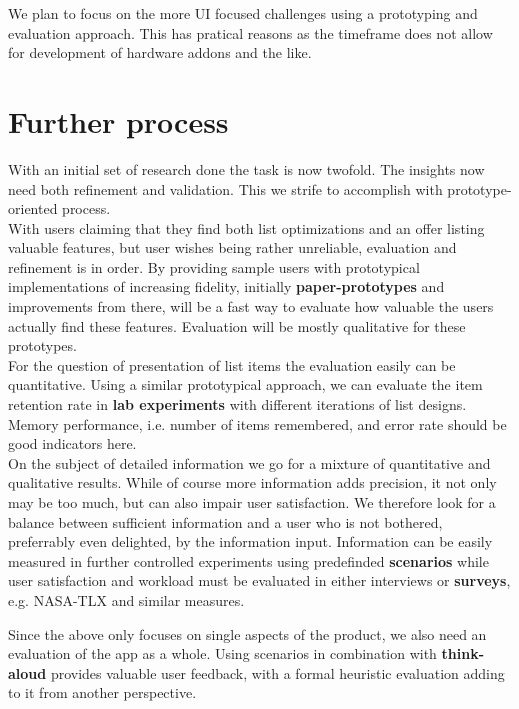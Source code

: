 \documentclass{scrartcl}
\begin{document}
We plan to focus on the more UI focused challenges using a prototyping and evaluation approach. This has pratical reasons as the timeframe does not allow for development of hardware addons and the like.

\section{Further process}
\label{sec:process}
With an initial set of research done the task is now twofold. The insights now need both refinement and validation. This we strife to accomplish with prototype-oriented process.\\

With users claiming that they find both list optimizations and an offer listing valuable features, but user wishes being rather unreliable, evaluation and refinement is in order.
By providing sample users with prototypical implementations of increasing fidelity, initially \textbf{paper-prototypes} and improvements from there, will be a fast way to evaluate how valuable the users actually find these features. 
Evaluation will be mostly qualitative for these prototypes. \\

For the question of presentation of list items the evaluation easily can be quantitative. Using a similar prototypical approach, we can evaluate the item retention rate in \textbf{lab experiments} with different iterations of list designs.
Memory performance, i.e. number of items remembered, and error rate should be good indicators here.\\

On the subject of detailed information we go for a mixture of quantitative and qualitative results. While of course more information adds precision, it not only may be too much, but can also impair user satisfaction.
We therefore look for a balance between sufficient information and a user who is not bothered, preferrably even delighted, by the information input.
Information can be easily measured in further controlled experiments using predefinded \textbf{scenarios} while user satisfaction and workload must be evaluated in either interviews or \textbf{surveys}, e.g. NASA-TLX and similar measures. 

Since the above only focuses on single aspects of the product, we also need an evaluation of the app as a whole. Using scenarios in combination with \textbf{think-aloud} provides valuable user feedback, with a formal heuristic evaluation adding to it from another perspective.
\end{document}
